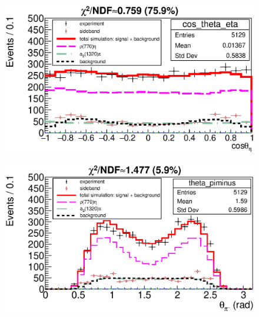 \documentclass{beamer}
\begin{document}
\begin{frame}
\begin{minipage}[t]{0.48\linewidth}
\begin{figure}
    \end{figure}
  \end{minipage}
  \begin{minipage}[t]{0.48\linewidth}
    \begin{figure}
      \includegraphics[width=\linewidth]{figures/cos_theta_eta_g950.eps}
    \end{figure}
  \end{minipage}
  \begin{minipage}[t]{0.48\linewidth}
    \begin{figure}
      \includegraphics[width=\linewidth]{figures/theta_piminus_g950.eps}
    \end{figure}
  \end{minipage}
\end{frame}
\end{document}
